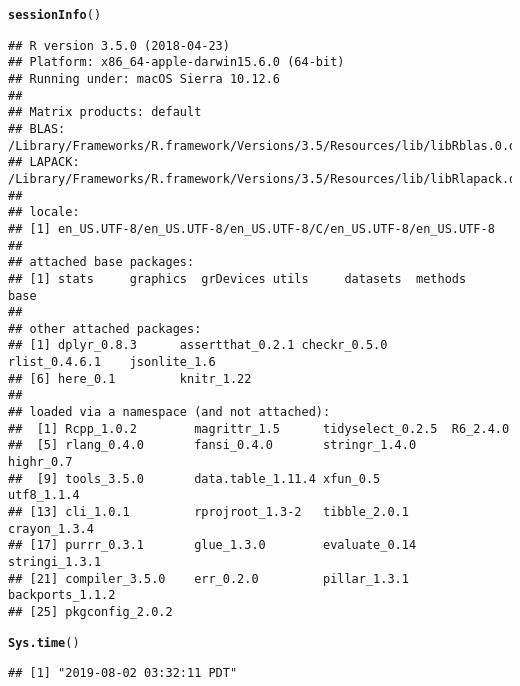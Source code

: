\documentclass{article}\usepackage[]{graphicx}\usepackage[]{color}
\makeatletter
\newcommand{\hlstd}[1]{\textcolor[rgb]{0.345,0.345,0.345}{#1}}%
\newcommand{\hlkwd}[1]{\textcolor[rgb]{0.737,0.353,0.396}{\textbf{#1}}}%
\newenvironment{kframe}{%
 \def\at@end@of@kframe{}%
 \ifinner\ifhmode%
  \def\at@end@of@kframe{\end{minipage}}%
  \begin{minipage}{\columnwidth}%
 \fi\fi%
 \def\FrameCommand##1{\hskip\@totalleftmargin \hskip-\fboxsep
 \colorbox{shadecolor}{##1}\hskip-\fboxsep
     \hskip-\linewidth \hskip-\@totalleftmargin \hskip\columnwidth}%
 \MakeFramed {\advance\hsize-\width
   \@totalleftmargin\z@ \linewidth\hsize
   \@setminipage}}%
 {\par\unskip\endMakeFramed%
 \at@end@of@kframe}
\newenvironment{knitrout}{}{} %
\makeatother
\begin{document}
\begin{knitrout}
\color{fgcolor}\begin{kframe}
\begin{alltt}
\hlkwd{sessionInfo}\hlstd{()}
\end{alltt}
\begin{verbatim}
## R version 3.5.0 (2018-04-23)
## Platform: x86_64-apple-darwin15.6.0 (64-bit)
## Running under: macOS Sierra 10.12.6
## 
## Matrix products: default
## BLAS: /Library/Frameworks/R.framework/Versions/3.5/Resources/lib/libRblas.0.dylib
## LAPACK: /Library/Frameworks/R.framework/Versions/3.5/Resources/lib/libRlapack.dylib
## 
## locale:
## [1] en_US.UTF-8/en_US.UTF-8/en_US.UTF-8/C/en_US.UTF-8/en_US.UTF-8
## 
## attached base packages:
## [1] stats     graphics  grDevices utils     datasets  methods   base     
## 
## other attached packages:
## [1] dplyr_0.8.3      assertthat_0.2.1 checkr_0.5.0     rlist_0.4.6.1    jsonlite_1.6    
## [6] here_0.1         knitr_1.22      
## 
## loaded via a namespace (and not attached):
##  [1] Rcpp_1.0.2        magrittr_1.5      tidyselect_0.2.5  R6_2.4.0         
##  [5] rlang_0.4.0       fansi_0.4.0       stringr_1.4.0     highr_0.7        
##  [9] tools_3.5.0       data.table_1.11.4 xfun_0.5          utf8_1.1.4       
## [13] cli_1.0.1         rprojroot_1.3-2   tibble_2.0.1      crayon_1.3.4     
## [17] purrr_0.3.1       glue_1.3.0        evaluate_0.14     stringi_1.3.1    
## [21] compiler_3.5.0    err_0.2.0         pillar_1.3.1      backports_1.1.2  
## [25] pkgconfig_2.0.2
\end{verbatim}
\begin{alltt}
\hlkwd{Sys.time}\hlstd{()}
\end{alltt}
\begin{verbatim}
## [1] "2019-08-02 03:32:11 PDT"
\end{verbatim}
\end{kframe}
\end{knitrout}
\end{document}
